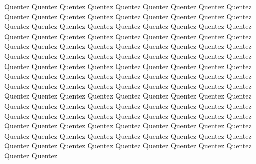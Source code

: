 Quentez Quentez Quentez Quentez Quentez Quentez Quentez Quentez Quentez Quentez Quentez Quentez Quentez Quentez Quentez Quentez Quentez Quentez Quentez Quentez Quentez Quentez Quentez Quentez Quentez Quentez Quentez Quentez Quentez Quentez Quentez Quentez Quentez Quentez Quentez Quentez Quentez Quentez Quentez Quentez Quentez Quentez Quentez Quentez Quentez Quentez Quentez Quentez Quentez Quentez Quentez Quentez Quentez Quentez Quentez Quentez Quentez Quentez Quentez Quentez Quentez Quentez Quentez Quentez Quentez Quentez Quentez Quentez Quentez Quentez Quentez Quentez Quentez Quentez Quentez Quentez Quentez Quentez Quentez Quentez Quentez Quentez Quentez Quentez Quentez Quentez Quentez Quentez Quentez Quentez Quentez Quentez Quentez Quentez Quentez Quentez Quentez Quentez Quentez Quentez Quentez Quentez Quentez Quentez Quentez Quentez Quentez Quentez Quentez Quentez Quentez Quentez Quentez Quentez Quentez Quentez Quentez Quentez Quentez Quentez Quentez Quentez Quentez Quentez Quentez Quentez Quentez Quentez Quentez Quentez Quentez Quentez Quentez Quentez Quentez Quentez Quentez 